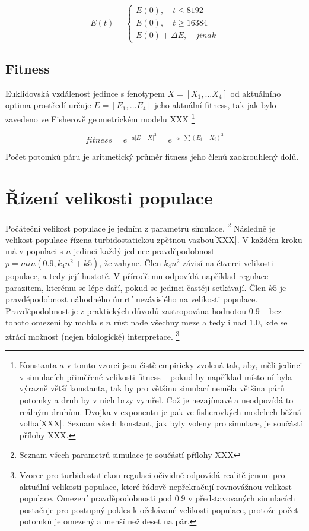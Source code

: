 \begin{equation}
E(t) = \left \{
     \begin{array}{l} E(0), \quad t \leq 8192 \\
                      E(0), \quad t \geq 16384 \\
                      E(0) + \Delta{E}, \quad jinak
     \end{array} \right .
\end{equation}

\subsection{Fitness}

Euklidovská vzdálenost jedince s fenotypem $X = [X_1,\dots{}X_4]$ od aktuálního optima prostředí určuje
$E = [E_1,\dots{} E_4]$ jeho aktuální fitness, tak jak bylo zavedeno ve Fisherově geometrickém modelu XXX
\footnote{Konstanta $a$ v tomto vzorci jsou čistě empiricky zvolená tak, aby, měli jedinci v simulacích
přiměřené velikosti fitness -- pokud by například místo ní byla výrazně větší konstanta, tak by pro většinu simulací
neměla většina párů potomky a druh by v nich brzy vymřel. Což je nezajímavé a neodpovídá to reálným druhům.
Dvojka v exponentu je pak ve fisherovkých modelech běžná volba[XXX].
Seznam všech konstant, jak byly voleny pro simulace, je součástí přílohy XXX.}

\begin{equation}
fitness = e^{-a |E-X|^2} = e^{-a\cdot{\sum{(E_i - X_i)^2}}}
\end{equation}

Počet potomků páru je aritmetický průměr fitness jeho členů zaokrouhlený dolů.


\section{Řízení velikosti populace}

Počáteční velikost populace je jedním z parametrů simulace.
\footnote{Seznam všech parametrů simulace je součástí přílohy XXX}
Následně je velikost populace řízena turbidostatickou
zpětnou vazbou[XXX]. V každém kroku má v populaci s $n$ jedinci každý jedinec pravděpodobnost
$p = min(0.9, k_4 n^2 + k5)$, že zahyne. Člen $k_4 n^2$ závisí na čtverci velikosti populace, a tedy její hustotě.
V přírodě mu odpovídá například regulace parazitem, kterému se lépe daří, pokud se jedinci častěji setkávají.
Člen $k5$ je pravděpodobnost náhodného úmrtí nezávislého na velikosti populace. Pravděpodobnost je z praktických důvodů
zastropována hodnotou 0.9 -- bez tohoto omezení by mohla s $n$ růst nade všechny meze a tedy i nad $1.0$, kde se ztrácí
možnost (nejen biologické) interpretace.
\footnote{Vzorec pro turbidostatickou regulaci očividně odpovídá realitě jenom pro aktuální velikosti populace,
které řádově nepřekračují rovnovážnou velikost populace. Omezení pravděpodobnosti pod $0.9$ v představovaných
simulacích postačuje pro postupný pokles k očekávané velikosti populace, protože počet potomků je omezený a
menší než deset na pár.}

